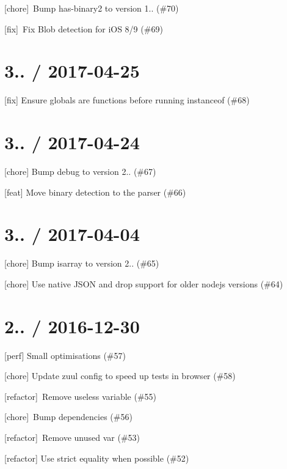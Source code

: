 
\begin{DoxyItemize}
\item \mbox{[}chore\mbox{]} \+Bump has-\/binary2 to version 1.. (\#70)
\item \mbox{[}fix\mbox{]} \+Fix Blob detection for i\+OS 8/9 (\#69)
\end{DoxyItemize}

\section*{3.. / 2017-\/04-\/25 }


\begin{DoxyItemize}
\item \mbox{[}fix\mbox{]} Ensure globals are functions before running {\ttfamily instanceof} (\#68)
\end{DoxyItemize}

\section*{3.. / 2017-\/04-\/24 }


\begin{DoxyItemize}
\item \mbox{[}chore\mbox{]} Bump debug to version 2.. (\#67)
\item \mbox{[}feat\mbox{]} Move binary detection to the parser (\#66)
\end{DoxyItemize}

\section*{3.. / 2017-\/04-\/04 }


\begin{DoxyItemize}
\item \mbox{[}chore\mbox{]} Bump isarray to version 2.. (\#65)
\item \mbox{[}chore\mbox{]} Use native J\+S\+ON and drop support for older nodejs versions (\#64)
\end{DoxyItemize}

\section*{2.. / 2016-\/12-\/30 }


\begin{DoxyItemize}
\item \mbox{[}perf\mbox{]} Small optimisations (\#57)
\item \mbox{[}chore\mbox{]} Update zuul config to speed up tests in browser (\#58)
\item \mbox{[}refactor\mbox{]} \+Remove useless variable (\#55)
\item \mbox{[}chore\mbox{]} \+Bump dependencies (\#56)
\item \mbox{[}refactor\mbox{]} \+Remove unused var (\#53)
\item \mbox{[}refactor\mbox{]} Use strict equality when possible (\#52)
\end{DoxyItemize}

